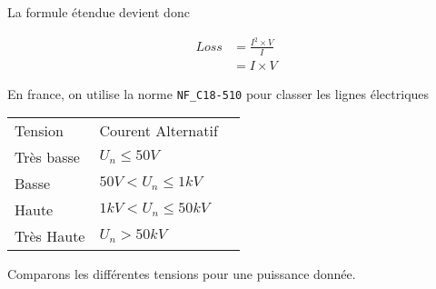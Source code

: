 La formule étendue devient donc

\begin{equation} \label{loss}
  \begin{aligned}
    Loss & = \frac{I^2\times V}{I} \\
         & = I \times V
  \end{aligned}
\end{equation}

En france, on utilise la norme \texttt{NF\_C18-510} pour classer les lignes électriques

\begin{table}[]
  \begin{tabular}{lll}
  Tension    & Courent Alternatif     \\
  Très basse & $U_n \leq 50V$         \\
  Basse      & $50V < U_n \leq 1kV$   \\
  Haute      & $1kV < U_n \leq 50kV$  \\
  Très Haute & $U_n > 50kV$
\end{tabular}
\end{table}


Comparons les différentes tensions pour une puissance donnée.


